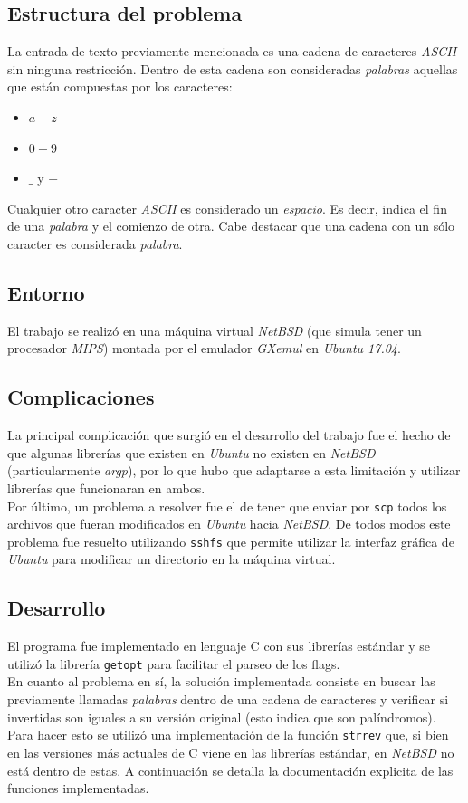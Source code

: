 \documentclass[a4paper, 10pt]{article}
\def\code#1{\texttt{#1}}
\newcommand\tab[1][0.5cm]{\hspace*{#1}}
\begin{document}
		\subsection{Estructura del problema}
			La entrada de texto previamente mencionada es una cadena de caracteres \emph{ASCII}
			sin ninguna restricción. Dentro de esta cadena son consideradas \emph{palabras} aquellas
			que están compuestas por los caracteres:
			\begin{itemize}
				\item $a-z$
				\item $0-9$
				\item $\_$ y $-$
			\end{itemize}
			\tab Cualquier otro caracter \emph{ASCII} es considerado un \emph{espacio}. Es decir,
			indica el fin de una \emph{palabra} y el comienzo de otra. Cabe destacar que una cadena
			con un sólo caracter es considerada \emph{palabra}.
		\subsection{Entorno}
			El trabajo se realizó en una máquina virtual \emph{NetBSD} (que simula tener un procesador
			\emph{MIPS}) montada por el emulador \emph{GXemul} en \emph{Ubuntu 17.04}.
		\subsection{Complicaciones}
			La principal complicación que surgió en el desarrollo del trabajo fue el hecho de que algunas
			librerías que existen en \emph{Ubuntu} no existen en \emph{NetBSD} (particularmente \emph{argp}),
			por lo que hubo que adaptarse a esta limitación y utilizar librerías que funcionaran en ambos. \\
			\tab Por último, un problema a resolver fue el de tener que enviar por \code{scp} todos los archivos
			que fueran modificados en \emph{Ubuntu} hacia \emph{NetBSD}. De todos modos este problema fue
			resuelto utilizando \code{sshfs} que permite utilizar la interfaz gráfica de \emph{Ubuntu} para
			modificar un directorio en la máquina virtual.
		\subsection{Desarrollo}
			El programa fue implementado en lenguaje C con sus librerías estándar y se utilizó la librería
			\code{getopt} para facilitar el parseo de los flags. \\
			\tab En cuanto al problema en sí, la solución implementada consiste en buscar las previamente
			llamadas \emph{palabras} dentro de una cadena de caracteres y verificar si invertidas son iguales
			a su versión original (esto indica que son palíndromos). Para hacer esto se utilizó una implementación
			de la función \code{strrev} que, si bien en las versiones más actuales de C viene en las librerías
			estándar, en \emph{NetBSD} no está dentro de estas.
			A continuación se detalla la documentación explicita de las funciones implementadas.
\end{document}
